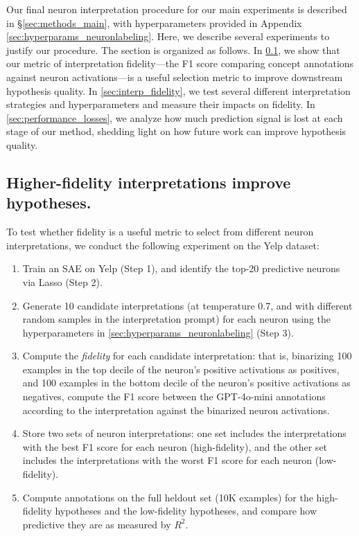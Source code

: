 Our final neuron interpretation procedure for our main experiments is described in \S\ref{sec:methods_main}, with hyperparameters provided in Appendix \ref{sec:hyperparams_neuronlabeling}. 
Here, we describe several experiments to justify our procedure. 
The section is organized as follows.
In \ref{sec:fidelity_predictiveness}, we show that our metric of interpretation fidelity—the F1 score comparing concept annotations against neuron activations—is a useful selection metric to improve downstream hypothesis quality.
In \ref{sec:interp_fidelity}, we test several different interpretation strategies and hyperparameters and measure their impacts on fidelity.
In \ref{sec:performance_losses}, we analyze how much prediction signal is lost at each stage of our method, shedding light on how future work can improve hypothesis quality.

\subsection{Higher-fidelity interpretations improve hypotheses.}
\label{sec:fidelity_predictiveness}

To test whether fidelity is a useful metric to select from different neuron interpretations, we conduct the following experiment on the Yelp dataset:
\begin{enumerate}
    \item Train an SAE on Yelp (Step 1), and identify the top-20 predictive neurons via Lasso (Step 2).
    \item Generate 10 candidate interpretations (at temperature 0.7, and with different random samples in the interpretation prompt) for each neuron using the hyperparameters in \ref{sec:hyperparams_neuronlabeling} (Step 3).
    \item Compute the \textit{fidelity} for each candidate interpretation: that is, binarizing 100 examples in the top decile of the neuron's positive activations as positives, and 100 examples in the bottom decile of the neuron's positive activations as negatives, compute the F1 score between the GPT-4o-mini annotations according to the interpretation against the binarized neuron activations. 
    \item Store two sets of neuron interpretations: one set includes the interpretations with the best F1 score for each neuron (high-fidelity), and the other set includes the interpretations with the worst F1 score for each neuron (low-fidelity).
    \item Compute annotations on the full heldout set (10K examples) for the high-fidelity hypotheses and the low-fidelity hypotheses, and compare how predictive they are as measured by $R^2$.
\end{enumerate}

